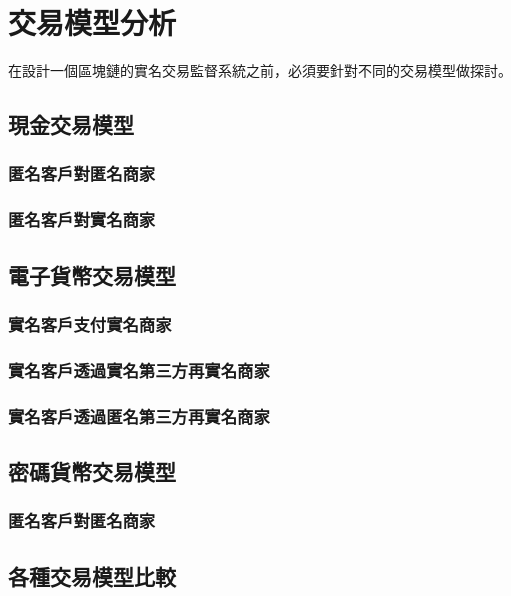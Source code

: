 
\chapter{交易模型分析}
在設計一個區塊鏈的實名交易監督系統之前，必須要針對不同的交易模型做探討。
	\section{現金交易模型}
		\subsection{匿名客戶對匿名商家}
		\subsection{匿名客戶對實名商家}
	\section{電子貨幣交易模型}
		\subsection{實名客戶支付實名商家}
		\subsection{實名客戶透過實名第三方再實名商家}
		\subsection{實名客戶透過匿名第三方再實名商家}
	\section{密碼貨幣交易模型}
		\subsection{匿名客戶對匿名商家}
	\section{各種交易模型比較}

